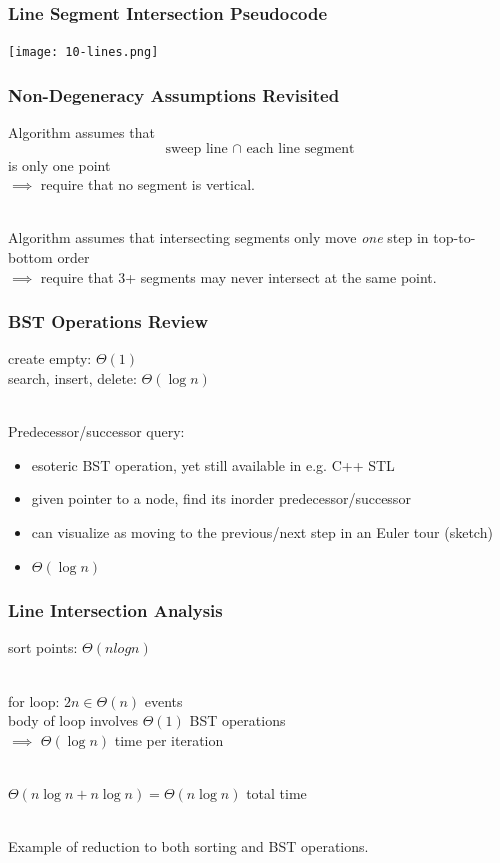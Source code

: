 \documentclass{beamer}
\newcommand{\stanza}{ \\~\ }
\begin{document}
\begin{frame} \frametitle{Line Segment Intersection Pseudocode}
\texttt{[image: 10-lines.png]}
\end{frame}

\begin{frame} \frametitle{Non-Degeneracy Assumptions Revisited}
Algorithm assumes that
\[ \text{sweep line } \cap \text{ each line segment} \]
is only one point \\
$\implies$ require that no segment is vertical. \stanza

Algorithm assumes that intersecting segments only move \emph{one} step
in top-to-bottom order \\
$\implies$ require that 3+ segments may never intersect at the same point.
\end{frame}

\begin{frame} \frametitle{BST Operations Review}
create empty: $\Theta(1)$ \\
search, insert, delete: $\Theta(\log n)$ \stanza

Predecessor/successor query:
\begin{itemize}
  \item esoteric BST operation, yet still available in e.g. C++ STL
  \item given pointer to a node, find its inorder predecessor/successor
  \item can visualize as moving to the previous/next step in an Euler tour
    (sketch)
  \item $\Theta(\log n)$
\end{itemize}
\end{frame}

\begin{frame} \frametitle{Line Intersection Analysis}
  sort points: $\Theta(n log n)$ \stanza

  for loop: $2n \in \Theta(n)$ events \\
  body of loop involves $\Theta(1)$ BST operations \\
  $\implies$ $\Theta(\log n)$ time per iteration \stanza

  $\Theta(n \log n + n \log n) = \Theta(n \log n)$ total time \stanza

  Example of reduction to both sorting and BST operations.
\end{frame}
\end{document}
